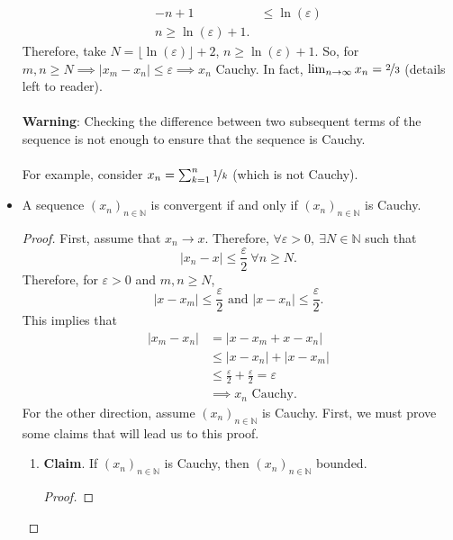\documentclass{article}
\newcommand{\N}{\mathbb{N}}
\newcommand{\seq}[2]{(#1_{#2})_{#2 \in \N}}
\newcommand{\?}{\stackrel{?}{=}}
\theoremstyle{definition} %
\begin{document}
\begin{itemize}
\begin{align*}
              -n + 1     & \leq \ln(\varepsilon) \\
              n \geq \ln(\varepsilon) + 1.
          \end{align*}
          Therefore, take $N = \lfloor \ln(\varepsilon) \rfloor + 2$, $n \geq \ln(\varepsilon) + 1$. So, for $m, n \geq N \implies |x_m - x_n| \leq \varepsilon \implies x_n$ Cauchy. In fact, $\lim_{n \to \infty} x_n = \nicefrac{2}{3}$ (details left to reader). \\\\
          \textbf{Warning}: Checking the difference between two subsequent terms of the sequence is not enough to ensure that the sequence is Cauchy. \\\\
          For example, consider $x_n = \sum_{k = 1}^n \nicefrac{1}{k}$ (which is not Cauchy).
    \item[]
          \begin{lemma}
              A sequence $\seq{x}{n}$ is convergent if and only if $\seq{x}{n}$ is Cauchy.
          \end{lemma}
          \begin{proof}
              First, assume that $x_n \rightarrow x$. Therefore, $\forall \varepsilon > 0, \ \exists N \in \N$ such that
              $$|x_n - x| \leq \frac{\varepsilon}{2} \ \forall n \geq N.$$
              Therefore, for $\varepsilon > 0$ and $m, n \geq N$,
              $$|x - x_m| \leq \frac{\varepsilon}{2} \text{ and } |x - x_n| \leq \frac{\varepsilon}{2}.$$
              This implies that
              \begin{align*}
                  |x_m - x_n| & = |x - x_m + x - x_n|                                            \\
                              & \leq |x - x_n| + |x - x_m|                                       \\
                              & \leq \frac{\varepsilon}{2} + \frac{\varepsilon}{2} = \varepsilon \\
                              & \implies x_n \text{ Cauchy}.
              \end{align*}
              For the other direction, assume $\seq{x}{n}$ is Cauchy. First, we must prove some claims that will lead us to this proof.
              \begin{enumerate}[label=(\arabic*)]
                  \item \textbf{Claim}. If $\seq{x}{n}$ is Cauchy, then $\seq{x}{n}$ bounded.
                        \begin{proof}

\end{proof}
\end{enumerate}
\end{proof}
\end{itemize}
\end{document}

